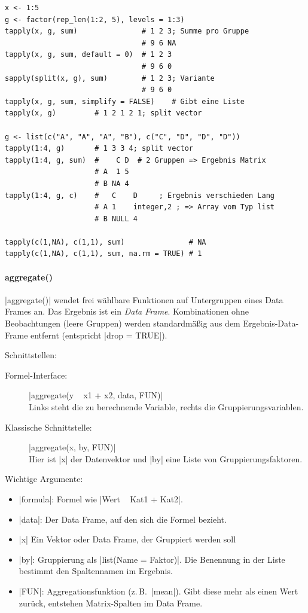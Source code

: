 \documentclass[10pt,twocolumn]{scrartcl}
\renewcommand{\lstinline}{\mycoloredinline}
\begin{document}
\begin{lstlisting}
x <- 1:5
g <- factor(rep_len(1:2, 5), levels = 1:3)
tapply(x, g, sum)               # 1 2 3; Summe pro Gruppe
                                # 9 6 NA
tapply(x, g, sum, default = 0)  # 1 2 3
                                # 9 6 0
sapply(split(x, g), sum)        # 1 2 3; Variante
                                # 9 6 0
tapply(x, g, sum, simplify = FALSE)    # Gibt eine Liste
tapply(x, g)         # 1 2 1 2 1; split vector

g <- list(c("A", "A", "A", "B"), c("C", "D", "D", "D"))
tapply(1:4, g)       # 1 3 3 4; split vector
tapply(1:4, g, sum)  #    C D  # 2 Gruppen => Ergebnis Matrix
                     # A  1 5
                     # B NA 4
tapply(1:4, g, c)    #   C    D     ; Ergebnis verschieden Lang
                     # A 1    integer,2 ; => Array vom Typ list
                     # B NULL 4        

tapply(c(1,NA), c(1,1), sum)               # NA
tapply(c(1,NA), c(1,1), sum, na.rm = TRUE) # 1
\end{lstlisting}


\paragraph{aggregate()}

\lstinline|aggregate()| wendet frei wählbare Funktionen auf Untergruppen eines Data Frames an. Das Ergebnis ist ein \emph{Data Frame}. Kombinationen ohne Beobachtungen (leere Gruppen) werden standardmäßig aus dem Ergebnis-Data-Frame entfernt (entspricht \lstinline|drop = TRUE|).

Schnittstellen:
\begin{description}
\item[Formel-Interface:] \lstinline|aggregate(y ~ x1 + x2, data, FUN)| \\
  Links steht die zu berechnende Variable, rechts die Gruppierungsvariablen.
\item[Klassische Schnittstelle:] \lstinline|aggregate(x, by, FUN)| \\
  Hier ist \lstinline|x| der Datenvektor und \lstinline|by| eine Liste von Gruppierungsfaktoren.
\end{description}

Wichtige Argumente:
\begin{itemize}
\item \lstinline|formula|: Formel wie \lstinline|Wert ~ Kat1 + Kat2|.
\item \lstinline|data|: Der Data Frame, auf den sich die Formel bezieht.
\item \lstinline|x| Ein Vektor oder Data Frame, der Gruppiert werden soll
\item \lstinline|by|: Gruppierung als \lstinline|list(Name = Faktor)|. Die Benennung in der Liste bestimmt den Spaltennamen im Ergebnis.
\item \lstinline|FUN|: Aggregationsfunktion (z.\,B.\ \lstinline|mean|). Gibt diese mehr als einen Wert zurück, entstehen Matrix-Spalten im Data Frame.
\end{itemize}
\end{document}
